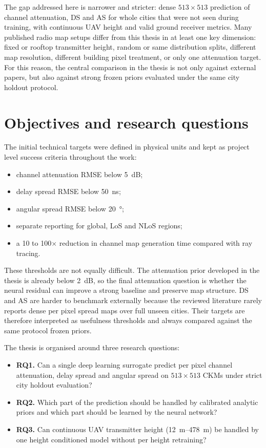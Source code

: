 The gap addressed here is narrower and stricter: dense \(513\times513\)
prediction of channel attenuation, DS and AS for whole cities that were not
seen during training, with continuous UAV height and valid ground receiver
metrics. Many published radio map setups differ from this thesis in at least
one key dimension: fixed or rooftop transmitter height, random or same
distribution splits, different map resolution, different building pixel
treatment, or only one attenuation target. For this reason, the central
comparison in the thesis is not only against external papers, but also against
strong frozen priors evaluated under the same city holdout protocol.

\section{Objectives and research questions}

The initial technical targets were defined in physical units and kept as
project level success criteria throughout the work:

\begin{itemize}
  \item channel attenuation RMSE below \SI{5}{dB};
  \item delay spread RMSE below \SI{50}{ns};
  \item angular spread RMSE below \SI{20}{\degree};
  \item separate reporting for global, LoS and NLoS regions;
  \item a 10 to 100\(\times\) reduction in channel map generation time compared
        with ray tracing.
\end{itemize}

These thresholds are not equally difficult. The attenuation prior developed in
the thesis is already below \SI{2}{dB}, so the final attenuation question is
whether the neural residual can improve a strong baseline and preserve map
structure. DS and AS are harder to benchmark externally because the reviewed
literature rarely reports dense per pixel spread maps over full unseen cities.
Their targets are therefore interpreted as usefulness thresholds and always
compared against the same protocol frozen priors.

The thesis is organised around three research questions:

\begin{itemize}
  \item \textbf{RQ1.} Can a single deep learning surrogate predict per pixel
        channel attenuation, delay spread and angular spread on \(513\times513\)
        CKMs under strict city holdout evaluation?
  \item \textbf{RQ2.} Which part of the prediction should be handled by
        calibrated analytic priors and which part should be learned by the
        neural network?
  \item \textbf{RQ3.} Can continuous UAV transmitter height
        (\SIrange{12}{478}{m}) be handled by one height conditioned model
        without per height retraining?
\end{itemize}

